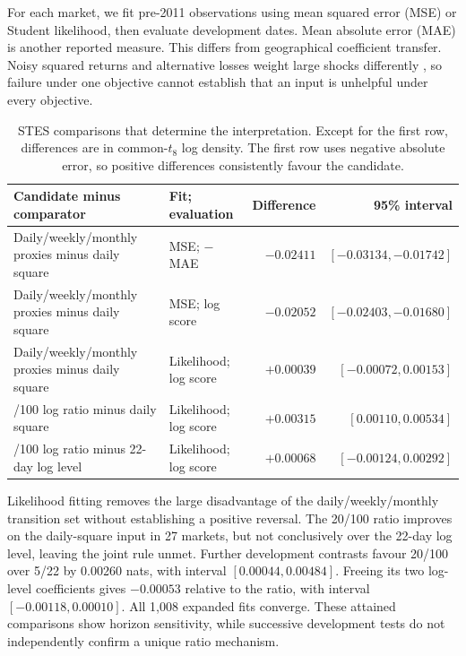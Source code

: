 For each market, we fit pre-2011 observations using mean squared error (MSE) or Student likelihood, then evaluate development dates. Mean absolute error (MAE) is another reported measure. This differs from geographical coefficient transfer. Noisy squared returns and alternative losses weight large shocks differently \citep{patton2011volatility}, so failure under one objective cannot establish that an input is unhelpful under every objective.

\begin{table}[!htbp]
\centering
\caption[Smooth-transition smoothing comparisons]{STES comparisons that determine the interpretation. Except for the first row, differences are in common-$t_8$ log density. The first row uses negative absolute error, so positive differences consistently favour the candidate.}
\label{tab:stes-results}
\small
\begin{tabular}{>{\raggedright\arraybackslash}p{}>{\raggedright\arraybackslash}p{}rr}
\toprule
Candidate minus comparator & Fit; evaluation & Difference & 95\% interval \\
\midrule
Daily/weekly/monthly proxies minus daily square & MSE; $-$MAE & $-0.02411$ & $[-0.03134,-0.01742]$ \\
Daily/weekly/monthly proxies minus daily square & MSE; log score & $-0.02052$ & $[-0.02403,-0.01680]$ \\
Daily/weekly/monthly proxies minus daily square & Likelihood; log score & $+0.00039$ & $[-0.00072,0.00153]$ \\
20/100 log ratio minus daily square & Likelihood; log score & $+0.00315$ & $[0.00110,0.00534]$ \\
20/100 log ratio minus 22-day log level & Likelihood; log score & $+0.00068$ & $[-0.00124,0.00292]$ \\
\bottomrule
\end{tabular}
\end{table}

Likelihood fitting removes the large disadvantage of the daily/weekly/monthly transition set without establishing a positive reversal. The 20/100 ratio improves on the daily-square input in 27 markets, but not conclusively over the 22-day log level, leaving the joint rule unmet. Further development contrasts favour 20/100 over 5/22 by 0.00260 nats, with interval $[0.00044,0.00484]$. Freeing its two log-level coefficients gives $-0.00053$ relative to the ratio, with interval $[-0.00118,0.00010]$. All 1,008 expanded fits converge. These attained comparisons show horizon sensitivity, while successive development tests do not independently confirm a unique ratio mechanism.

